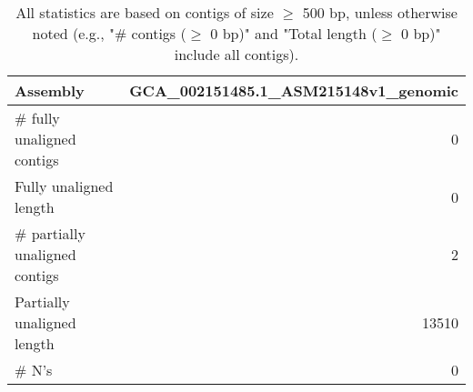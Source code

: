 \documentclass[12pt,a4paper]{article}
\begin{document}
\begin{table}[ht]
\begin{center}
\caption{All statistics are based on contigs of size $\geq$ 500 bp, unless otherwise noted (e.g., "\# contigs ($\geq$ 0 bp)" and "Total length ($\geq$ 0 bp)" include all contigs).}
\begin{tabular}{|l*{1}{|r}|}
\hline
Assembly & GCA\_002151485.1\_ASM215148v1\_genomic \\ \hline
\# fully unaligned contigs & 0 \\ \hline
Fully unaligned length & 0 \\ \hline
\# partially unaligned contigs & 2 \\ \hline
Partially unaligned length & 13510 \\ \hline
\# N's & 0 \\ \hline
\end{tabular}
\end{center}
\end{table}
\end{document}
